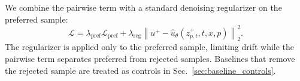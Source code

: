\documentclass[10pt,twocolumn,letterpaper]{article}
\begin{document}
We combine the pairwise term with a standard denoising regularizer on the preferred sample:
\begin{equation}
\mathcal{L}
= \lambda_{\mathrm{pref}}\mathcal{L}_{\mathrm{pref}}
+ \lambda_{\mathrm{reg}}
\left\|
u^+ - \hat{u}_\theta(z_{p,t}^+,t,x,p)
\right\|_2^2 .
\label{eq:total_loss}
\end{equation}
The regularizer is applied only to the preferred sample, limiting drift while the pairwise term separates preferred from rejected samples. Baselines that remove the rejected sample are treated as controls in Sec.~\ref{sec:baseline_controls}.


\end{document}
